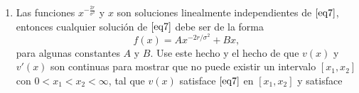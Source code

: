 \documentclass[letterpaper]{article}
\newcommand{\abs}[1]{\left\lvert #1 \right\rvert}
\newcommand{\1}{\mathds{1}}
\theoremstyle{definition}
\theoremstyle{definition}
\theoremstyle{definition}
\theoremstyle{definition}
\theoremstyle{definition}
\begin{document}
\begin{itemize}
\begin{enumerate}
        Esta es una ecuación diferencial de segundo orden lineal, y tiene dos soluciones de la forma 
        $x^{p}$. Sustituya $x^p$ en \eqref{eq7} y muestre que los únicos valores de $p$ que producen que $x^{p}$ satisfaga
        \eqref{eq7} son $p=-\frac{2r}{\sigma^2}$ y $p=1$.
        \begin{proof} 
          Supongamos que se satisface \eqref{eq7}. Sustituyendo $v(x)=x^{p}$, se tiene que 
          \[
            rx^{p}-rxpx^{p-1}-\frac{1}{2}\sigma^2x^2p(p-1)x^{p-2}=0 \iff rx^{p}-rpx^{p}-\frac{1}{2}\sigma^2p(p-1)x^{p}=0,
          \]
          y ahora, suponiendo que $x=0$ es un valor dentro del intervalo, se tiene la igualdad anterior. Supongamos ahora que $x\neq0$. Entonces cancelando 
          términos y resolviendo para $p$, se tiene que 
          
          \begin{align*}
            r-rp-\frac{1}{2}\sigma^2p(p-1)=0 &\iff p^2+p(\frac{2r}{\sigma^2}-1)=\frac{2r}{\sigma^2}\\
            &\iff p^2+2p \left(\frac{r}{\sigma^2}-\frac{1}{2}\right)+\left(\frac{r}{\sigma^2}-\frac{1}{2}\right)^2=\frac{2r}{\sigma^2}+\left(\frac{r}{\sigma^2}-\frac{1}{2}\right)^2\\
            &\iff \left(p+\frac{r}{\sigma^2}-\frac{1}{2}\right)^2=\frac{2r}{\sigma^2}+\left(\frac{r}{\sigma^2}-\frac{1}{2}\right)^2\\
            &\iff \left(p+\frac{r}{\sigma^2}-\frac{1}{2}\right)^2=\frac{r^2}{\sigma^4}+2\frac{r}{\sigma^2}\left(\frac{1}{2}\right)+\frac{1}{4}\\
            &\iff \abs{p+\frac{r}{\sigma^2}-\frac{1}{2}}=\abs{\frac{r}{\sigma^2}+\frac{1}{2}}\\
            &\iff \begin{cases}
                p+\frac{r}{\sigma^2}-\frac{1}{2}=\frac{r}{\sigma^2}+\frac{1}{2} \qquad \iff \qquad p=1\\
                p+\frac{r}{\sigma^2}-\frac{1}{2}=-\frac{r}{\sigma^2}-\frac{1}{2} \qquad \iff \qquad p=-\frac{2r}{\sigma^2}\\
                \end{cases}
          \end{align*}
          \end{proof}
        \item Las funciones $x^{-\frac{2r}{\sigma^2}}$ y $x$ son soluciones linealmente independientes 
        de $\eqref{eq7}$, entonces cualquier solución de $\eqref{eq7}$ debe ser de la forma 
        \[
        f(x)=Ax^{-2r/\sigma^2}+Bx,    
        \]
        para algunas constantes $A$ y $B$. Use este hecho y el hecho de que $v(x)$ y $v'(x)$ son continuas
        para mostrar que no puede existir un intervalo $[x_1,x_2]$ con $0<x_1<x_2<\infty$, tal que 
        $v(x)$ satisface $\eqref{eq7}$ en $[x_1,x_2]$ y satisface 
        

\end{enumerate}
\end{itemize}
\end{document}
